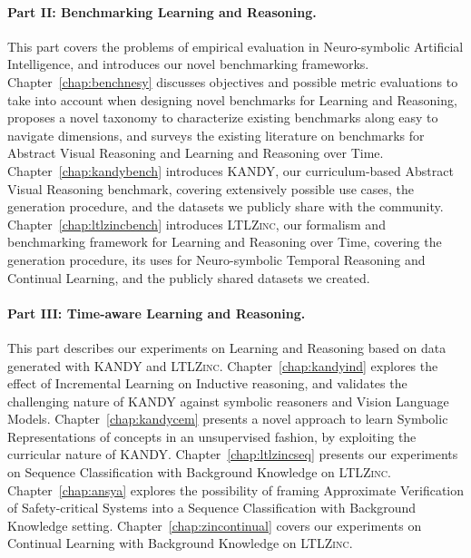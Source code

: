 \paragraph{Part II: Benchmarking Learning and Reasoning.} This part covers the problems of empirical evaluation in Neuro-symbolic Artificial Intelligence, and introduces our novel benchmarking frameworks.
Chapter~\ref{chap:benchnesy} discusses objectives and possible metric evaluations to take into account when designing novel benchmarks for Learning and Reasoning, proposes a novel taxonomy to characterize existing benchmarks along easy to navigate dimensions, and surveys the existing literature on benchmarks for Abstract Visual Reasoning and Learning and Reasoning over Time. Chapter~\ref{chap:kandybench} introduces \textsc{KANDY}, our curriculum-based Abstract Visual Reasoning benchmark, covering extensively possible use cases, the generation procedure, and the datasets we publicly share with the community.
Chapter~\ref{chap:ltlzincbench} introduces \textsc{LTLZinc}, our formalism and benchmarking framework for Learning and Reasoning over Time, covering the generation procedure, its uses for Neuro-symbolic Temporal Reasoning and Continual Learning, and the publicly shared datasets we created.

\paragraph{Part III: Time-aware Learning and Reasoning.} This part describes our experiments on Learning and Reasoning based on data generated with \textsc{KANDY} and \textsc{LTLZinc}.
Chapter~\ref{chap:kandyind} explores the effect of Incremental Learning on Inductive reasoning, and validates the challenging nature of \textsc{KANDY} against symbolic reasoners and Vision Language Models. Chapter~\ref{chap:kandycem} presents a novel approach to learn Symbolic Representations of concepts in an unsupervised fashion, by exploiting the curricular nature of \textsc{KANDY}.
Chapter~\ref{chap:ltlzincseq} presents our experiments on Sequence Classification with Background Knowledge on \textsc{LTLZinc}.
Chapter~\ref{chap:ansya} explores the possibility of framing Approximate Verification of Safety-critical Systems into a Sequence Classification with Background Knowledge setting.
Chapter~\ref{chap:zincontinual} covers our experiments on Continual Learning with Background Knowledge on \textsc{LTLZinc}.

